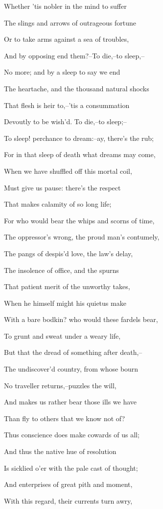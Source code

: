 \documentclass[12pt]{book}
\begin{document}
Whether 'tis nobler in the mind to suffer

The slings and arrows of outrageous fortune

Or to take arms against a sea of troubles,

And by opposing end them?--To die,--to sleep,--

No more; and by a sleep to say we end

The heartache, and the thousand natural shocks

That flesh is heir to,--'tis a consummation

Devoutly to be wish'd. To die,--to sleep;--

To sleep! perchance to dream:--ay, there's the rub;

For in that sleep of death what dreams may come,

When we have shuffled off this mortal coil,

Must give us pause: there's the respect

That makes calamity of so long life;

For who would bear the whips and scorns of time,

The oppressor's wrong, the proud man's contumely,

The pangs of despis'd love, the law's delay,

The insolence of office, and the spurns

That patient merit of the unworthy takes,

When he himself might his quietus make

With a bare bodkin? who would these fardels bear,

To grunt and sweat under a weary life,

But that the dread of something after death,--

The undiscover'd country, from whose bourn

No traveller returns,--puzzles the will,

And makes us rather bear those ills we have

Than fly to others that we know not of?

Thus conscience does make cowards of us all;

And thus the native hue of resolution

Is sicklied o'er with the pale cast of thought;

And enterprises of great pith and moment,

With this regard, their currents turn awry,
\end{document}
